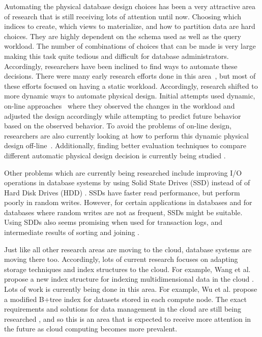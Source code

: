 \documentclass[12pt,a4paper]{article}
\begin{document}
Automating the physical database design choices has been a very attractive area of research that is still receiving lots of attention until now. Choosing which
indices to create, which views to materialize, and how to partition data are hard choices. They are highly dependent on the schema used as well
as the query workload. The number of combinations of choices that can be made is very large making this task quite tedious and difficult for database
administrators. Accordingly, researchers have been inclined to find ways to automate these decisions. There were many early research efforts done in this
area~\cite{finkelstein1988physical, chaudhuri1997overview, hammer76selec, frank1992selec, schiefer1999db2, valentin2000select}, but most of these efforts
focused on having a static workload. Accordingly, research shifted to more dynamic ways to automate physical design. Initial attempts used dynamic, on-line
approaches~\cite{bruno2007online, sattler2003, schnaitter2007} where they observed the changes in the workload and adjusted the design accordingly while
attempting to predict future behavior based on the observed behavior. To avoid the problems of on-line design, researchers are also currently looking at how to
perform this dynamic physical design off-line~\cite{hannes2008,agrawal2006}. Additionally, finding better evaluation techniques to compare different
automatic physical design decision is currently being studied \cite{gebaly2008}.

Other problems which are currently being researched include improving I/O operations in database systems by using Solid State Drives (SSD) instead of of Hard
Disk Drives (HDD) \cite{lee2009, du2009, lee2008}. SSDs have faster read performance, but perform poorly in random writes. However, for certain applications in
databases and for databases where random writes are not as frequent, SSDs might be suitable. Using SDDs also seems promising when used for
transaction logs, and intermediate results of sorting and joining \cite{lee2008}.

Just like all other research areas are moving to the cloud, database systems are moving there too. Accordingly, lots of current research focuses on adapting
storage techniques and index structures to the cloud. For example, Wang et al. propose a new index structure for indexing multidimensional data in the
cloud \cite{wang2010indexing}. Lots of work is currently being done in this area. For example, Wu et al. \cite{wu2010efficient} propose a modified B+tree index
for datasets stored in each compute node. The exact requirements and solutions for data management in the cloud are still being
researched \cite{abadi2009data}, and so this is an area that is expected to receive more attention in the future as cloud computing becomes more prevalent.
\end{document}
